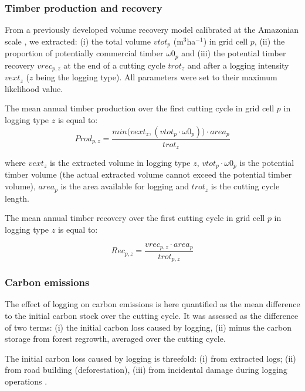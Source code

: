 \documentclass{article}
\begin{document}
\subsubsection{Timber production and recovery}

From a previously developed volume recovery model calibrated at the Amazonian scale \cite{Piponiotc}, we extracted: (i) the total volume $vtot_p$ (m$^3$ha$^{-1}$) in grid cell $p$, (ii) the proportion of potentially commercial timber $\omega 0_p$ and (iii) the potential timber recovery $vrec_{p,z}$ at the end of a cutting cycle $trot_z$ and after a logging intensity $vext_z$ ($z$ being the logging type). All parameters were set to their maximum likelihood value.

The mean annual timber production over the first cutting cycle in grid cell $p$ in logging type $z$ is equal to: 
\begin{equation}
\label{eq:prod}
    Prod_{p,z}  =  \frac{min\big(vext_z, (vtot_p\cdot \omega 0_p) \big) \cdot area_p}{trot_z}
\end{equation}

where $vext_z$ is the extracted volume in logging type $z$, $vtot_p\cdot \omega 0_p$ is the potential timber volume (the actual extracted volume cannot exceed the potential timber volume), $area_p$ is the area available for logging and $trot_z$ is the cutting cycle length.

The mean annual timber recovery over the first cutting cycle in grid cell $p$ in logging type $z$ is equal to: 

\begin{equation}
\label{eq:rec}
    Rec_{p,z} = \frac{vrec_{p,z}\cdot area_p}{trot_{p,z}}
\end{equation}

\subsubsection{Carbon emissions}

The effect of logging on carbon emissions is here quantified as the mean difference to the initial carbon stock over the cutting cycle. It was assessed as the difference of two terms: (i) the initial carbon loss caused by logging, (ii) minus the carbon storage from forest regrowth, averaged over the cutting cycle. 

The initial carbon loss caused by logging is threefold: (i) from extracted logs; (ii) from road building (deforestation), (iii) from incidental damage during logging operations \cite{Piponiot2016}. 
\end{document}
